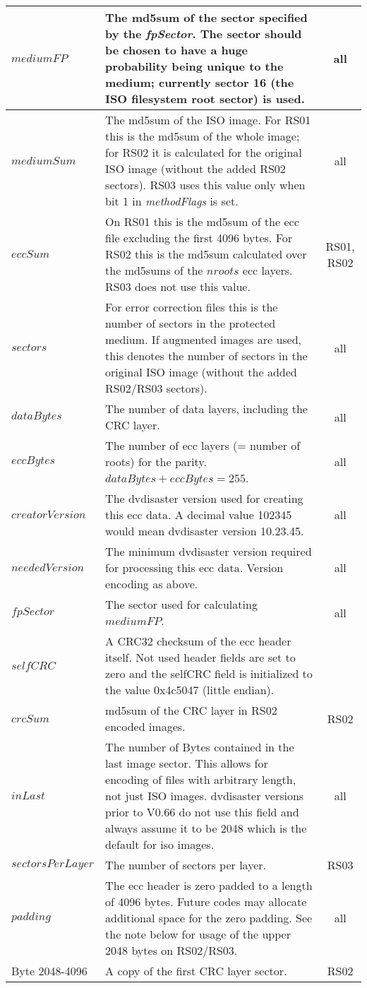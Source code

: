 \begin{tabular}{|l|p{10cm}|c|}
\hline
$mediumFP$ & The md5sum of the sector specified by the {\em fpSector}.
The sector should be chosen to have a huge probability being unique to the medium;
currently sector 16 (the ISO filesystem root sector) is used. & all \\
\hline
$mediumSum$ & The md5sum of the ISO image. For RS01 this is the md5sum of the
whole image; for RS02 it is calculated for the original ISO image (without
the added RS02 sectors). RS03 uses this value only when bit 1 in
{\em methodFlags} is set. & all \\ 
\hline
$eccSum$ & On RS01 this is the md5sum of the ecc file excluding the first 4096
bytes. For RS02 this is the md5sum calculated over the md5sums of the $nroots$
ecc layers. RS03 does not use this value. & RS01, RS02 \\
\hline
$sectors$ & For error correction files this is the number of sectors in the
protected medium. If augmented images are used, this denotes the number of
sectors in the original ISO image (without the added RS02/RS03 sectors). & all \\
\hline
$dataBytes$ & The number of data layers, including the CRC layer. & all \\
\hline
$eccBytes$ & The number of ecc layers (= number of roots) for the parity.
$dataBytes + eccBytes = 255$. & all\\
\hline
$creatorVersion$ & The dvdisaster version used for creating this ecc data.
A decimal value 102345 would mean dvdisaster version 10.23.45. & all \\
\hline
$neededVersion$ & The minimum dvdisaster version required for 
processing this ecc data. Version encoding as above. & all \\
\hline
$fpSector$ & The sector used for calculating $mediumFP$. & all \\
\hline
$selfCRC$ & A CRC32 checksum of the ecc header itself. Not used 
header fields are set to zero and the selfCRC field is initialized to the 
value 0x4c5047 (little endian). & \\
\hline
$crcSum$ & md5sum of the CRC layer in RS02 encoded images. & RS02 \\
\hline
$inLast$ & The number of Bytes contained in the last image sector. This allows for
encoding of files with arbitrary length, not just ISO images. 
dvdisaster versions prior to V0.66 do not use this field and always assume it
to be 2048 which is the default for iso images. & all \\
\hline
$sectorsPerLayer$ & The number of sectors per layer. & RS03 \\
\hline
$padding$ & The ecc header is zero padded to a length of 4096 bytes. Future codes
may allocate additional space for the zero padding. See the note below for
usage of the upper 2048 bytes on RS02/RS03. & all \\
\hline
Byte 2048-4096 & A copy of the first CRC layer sector. & RS02 \\
\hline
\end{tabular}
